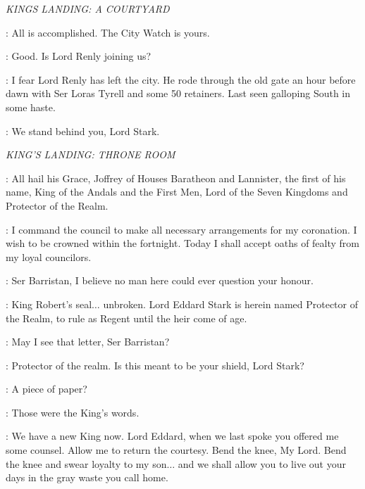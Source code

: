 \scene

\textit{KINGS LANDING: A COURTYARD} 


\LITTLEFINGER: All is accomplished. The City Watch is yours. 

\NED: Good. Is Lord Renly joining us? 

\VARYS: I fear Lord Renly has left the city. He rode through the old gate an hour before dawn with Ser Loras Tyrell and some 50 retainers. Last seen galloping South in some haste. 

\GOLDCLOAK: We stand behind you, Lord Stark. 



\scene

\textit{KING'S LANDING: THRONE ROOM} 


\PAGE:  All hail his Grace, Joffrey of Houses Baratheon and Lannister, the first of his name, King of the Andals and the First Men, Lord of the Seven Kingdoms and Protector of the Realm. 

\JOFFREY: I command the council to make all necessary arrangements for my coronation. I wish to be crowned within the fortnight. Today I shall accept oaths of fealty from my loyal councilors. 

\NED: Ser Barristan, I believe no man here could ever question your honour. 


\SELMY: King Robert's seal$\ldots$ unbroken. Lord Eddard Stark is herein named Protector of the Realm, to rule as Regent until the heir come of age. 

\CERSEI: May I see that letter, Ser Barristan?


\CERSEI: Protector of the realm. Is this meant to be your shield, Lord Stark? 

\CERSEI:  A piece of paper? 

\SELMY: Those were the King's words. 

\CERSEI: We have a new King now. Lord Eddard, when we last spoke you offered me some counsel. Allow me to return the courtesy. Bend the knee, My Lord. Bend the knee and swear loyalty to my son$\ldots$ and we shall allow you to live out your days in the gray waste you call home. 

